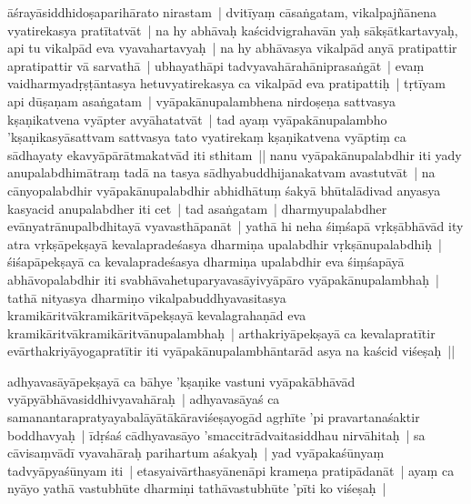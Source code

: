 \documentclass[article,a4paper]{memoir}
\begin{document}
ā\-śrayā\-siddhidoṣaparihā\-rato nirastam | \label{thakur75-91.18} dvitī\-yaṃ cā\-saṅgatam, vikalpajñā\-nena vyatirekasya pratī\-tatvā\-t | na hy abhā\-vaḥ kaścidvigrahavā\-n yaḥ sā\-kṣā\-tkartavyaḥ, api tu vikalpā\-d eva vyavahartavyaḥ | na hy abhā\-vasya vikalpā\-d anyā\- pratipattir apratipattir vā\- sarvathā\- | ubhayathā\-pi tadvyavahā\-rahā\-niprasaṅgā\-t | evaṃ vaidharmyadṛṣṭā\-ntasya hetuvyatirekasya ca vikalpā\-d eva pratipattiḥ | \label{thakur75-91.22} tṛtī\-yam api dū\-ṣaṇam asaṅgatam | vyā\-pakā\-nupalambhena nirdoṣeṇa sattvasya kṣaṇikatvena vyā\-pter avyā\-hatatvā\-t | \label{thakur75-91.23} tad ayaṃ vyā\-pakā\-nupalambho 'kṣaṇikasyā\-sattvam sattvasya tato vyatirekaṃ kṣaṇikatvena vyā\-ptiṃ ca sā\-dhayaty ekavyā\-pā\-rā\-tmakatvā\-d iti sthitam || \label{thakur75-91.25} nanu vyā\-pakā\-nupalabdhir iti yady anupalabdhimā\-traṃ tadā\- na tasya sā\-dhyabuddhijanakatvam avastutvā\-t | na cā\-nyopalabdhir vyā\-pakā\-nupalabdhir abhidhā\-tuṃ śakyā\- bhū\-talā\-divad anyasya kasyacid anupalabdher iti cet | \label{thakur75-91.27} tad asaṅgatam | dharmyupalabdher evā\-nyatrā\-nupalbdhitayā\- vyavasthā\-panā\-t | yathā\- hi neha śiṃśapā\- vṛkṣā\-bhā\-vā\-d ity atra vṛkṣā\-pekṣayā\- kevalapradeśasya dharmiṇa upalabdhir vṛkṣā\-nupalabdhiḥ | śiśapā\-pekṣayā\- ca kevalapradeśasya dharmiṇa upalabdhir eva śiṃśapā\-yā\- abhā\-vopalabdhir iti svabhā\-vahetuparyavasā\-yivyā\-pā\-ro vyā\-pakā\-nupalambhaḥ | tathā\- nityasya dharmiṇo vikalpabuddhyavasitasya kramikā\-ritvā\-kramikā\-ritvā\-pekṣayā\- kevalagrahaṇā\-d eva kramikā\-ritvā\-kramikā\-ritvā\-nupalambhaḥ | arthakriyā\-pekṣayā\- ca kevalapratī\-tir evā\-rthakriyā\-yogapratī\-tir iti vyā\-pakā\-nupalambhā\-ntarā\-d asya na kaścid viśeṣaḥ ||
	\pend
      

	  \pstart adhyavasā\-yā\-pekṣayā\- ca bā\-hye 'kṣaṇike vastuni vyā\-pakā\-bhā\-vā\-d vyā\-pyā\-bhā\-vasiddhivyavahā\-raḥ | adhyavasā\-yaś ca samanantarapratyayabalā\-yā\-tā\-kā\-raviśeṣayogā\-d agṛhī\-te 'pi pravartanaśaktir boddhavyaḥ | ī\-dṛśaś cā\-dhyavasā\-yo 'smaccitrā\-dvaitasiddhau nirvā\-hitaḥ | sa cā\-visaṃvā\-dī\- vyavahā\-raḥ parihartum aśakyaḥ | yad vyā\-pakaśū\-nyaṃ tadvyā\-pyaśū\-nyam iti | etasyaivā\-rthasyā\-nenā\-pi krameṇa pratipā\-danā\-t | ayaṃ ca nyā\-yo yathā\- vastubhū\-te dharmiṇi tathā\-vastubhū\-te 'pī\-ti ko viśeṣaḥ | 
	\pend
      
\end{document}
